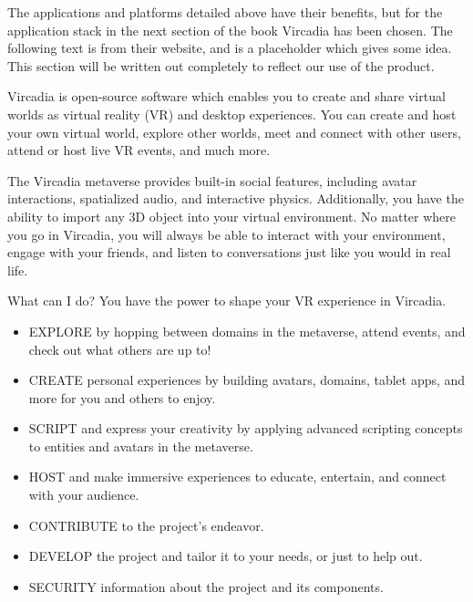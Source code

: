 The applications and platforms detailed above have their benefits, but for the application stack in the next section of the book Vircadia has been chosen. The following text is from their website, and is a placeholder which gives some idea. This section will be written out completely to reflect our use of the product.\par
Vircadia is open-source software which enables you to create and share virtual worlds as virtual reality (VR) and desktop experiences. You can create and host your own virtual world, explore other worlds, meet and connect with other users, attend or host live VR events, and much more.\par
The Vircadia metaverse provides built-in social features, including avatar interactions, spatialized audio, and interactive physics. Additionally, you have the ability to import any 3D object into your virtual environment. No matter where you go in Vircadia, you will always be able to interact with your environment, engage with your friends, and listen to conversations just like you would in real life.\par
What can I do? You have the power to shape your VR experience in Vircadia.
\begin{itemize}
\item EXPLORE by hopping between domains in the metaverse, attend events, and check out what others are up to!
\item CREATE personal experiences by building avatars, domains, tablet apps, and more for you and others to enjoy.
\item SCRIPT and express your creativity by applying advanced scripting concepts to entities and avatars in the metaverse.
\item HOST and make immersive experiences to educate, entertain, and connect with your audience.
\item CONTRIBUTE to the project's endeavor.
\item DEVELOP the project and tailor it to your needs, or just to help out.
\item SECURITY information about the project and its components.
\end{itemize}
